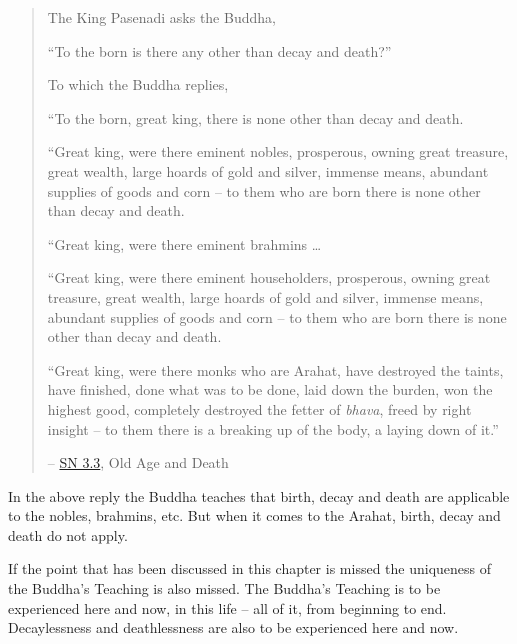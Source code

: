 \begin{quote}
The King Pasenadi asks the Buddha,

``To the born is there any other than decay and death?''

To which the Buddha replies,

``To the born, great king, there is none other than decay and death.

``Great king, were there eminent nobles, prosperous, owning great treasure, great wealth, large hoards of gold and silver, immense means, abundant supplies of goods and corn -- to them who are born there is none other than decay and death.

``Great king, were there eminent brahmins \ldots\hspace{0pt}

``Great king, were there eminent householders, prosperous, owning great treasure, great wealth, large hoards of gold and silver, immense means, abundant supplies of goods and corn -- to them who are born there is none other than decay and death.

``Great king, were there monks who are Arahat, have destroyed the taints, have finished, done what was to be done, laid down the burden, won the highest good, completely destroyed the fetter of \emph{bhava}, freed by right insight -- to them there is a breaking up of the body, a laying down of it.''

 -- \href{https://suttacentral.net/sn3.3/en/sujato}{SN 3.3}, Old Age and Death
\end{quote}

In the above reply the Buddha teaches that birth, decay and death are applicable to the nobles, brahmins, etc. But when it comes to the Arahat, birth, decay and death do not apply.

If the point that has been discussed in this chapter is missed the uniqueness of the Buddha's Teaching is also missed. The Buddha's Teaching is to be experienced here and now, in this life -- all of it, from beginning to end. Decaylessness and deathlessness are also to be experienced here and now.
